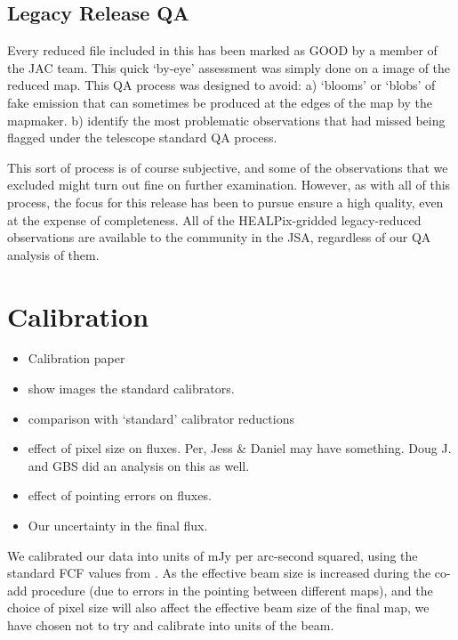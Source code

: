 \documentclass[usenatbib]{mn2e}
\newcommand{\status}[1]{\textsf{#1}}
\begin{document}
\subsection{Legacy Release QA}

Every reduced file included in this has been marked as \status{GOOD} by a
member of the JAC team. This quick `by-eye' assessment was simply done
on a image of the reduced map. This QA process was designed to avoid:
a) `blooms' or `blobs' of fake emission that can sometimes be produced
at the edges of the map by the mapmaker.  b) identify the most
problematic observations that had missed being flagged under the
telescope standard QA process.

This sort of process is of course subjective, and some of the
observations that we excluded might turn out fine on further
examination. However, as with all of this process, the focus for this
release has been to pursue ensure a high quality, even at the expense
of completeness. All of the HEALPix-gridded legacy-reduced
observations are available to the community in the JSA, regardless of
our QA analysis of them.


\section{Calibration}
\begin{itemize}
\item Calibration paper \citep{Dempsey2013}
\item show images the standard calibrators.
\item comparison with `standard' calibrator reductions
\item effect of pixel size on fluxes. Per, Jess \& Daniel may have
  something. Doug J. and GBS did an analysis on this as well.
\item effect of pointing errors on fluxes.
\item Our uncertainty in the final flux.
\end{itemize}


We calibrated our data into units of mJy per arc-second squared, using
the standard FCF values from \citet{Dempsey2013}.  As the
effective beam size is increased during the co-add procedure (due to
errors in the pointing between different maps), and the choice of
pixel size will also affect the effective beam size of the final map,
we have chosen not to try and calibrate into units of the beam.
\end{document}
